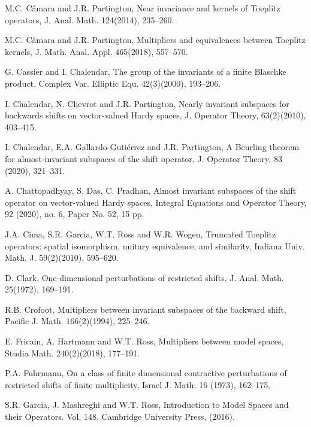 \documentclass[12pt,reqno]{amsart}
\theoremstyle{definition}
\theoremstyle{remark}
\numberwithin{equation}{section}
\begin{document}
\begin{thebibliography}{}
M.C. C\^{a}mara and J.R. Partington, Near invariance and kernels of Toeplitz operators,  J. Anal. Math. 124(2014), 235--260.

  M.C. C\^{a}mara and J.R. Partington,  Multipliers and equivalences between Toeplitz kernels, J. Math. Anal. Appl. 465(2018), 557--570.

G. Cassier and  I. Chalendar, The group of the invariants of a finite Blaschke product, Complex Var. Elliptic Equ.  42(3)(2000), 193--206.

 I. Chalendar, N. Chevrot and J.R. Partington,  Nearly invariant subspaces for backwards shifts on vector-valued Hardy spaces, J. Operator Theory, 63(2)(2010), 403--415.


I. Chalendar, E.A. Gallardo-Guti\'errez and J.R. Partington, A Beurling theorem for almost-invariant subspaces of the shift operator, J. Operator Theory, 83 (2020), 321--331.

A. Chattopadhyay, S. Das, C. Pradhan, Almost invariant subspaces of the shift operator on vector-valued Hardy spaces, Integral Equations and Operator Theory, 92 (2020), no. 6, Paper No. 52, 15 pp.


 J.A. Cima, S.R. Garcia, W.T. Ross and W.R. Wogen, Truncated Toeplitz operators: spatial isomorphism, unitary equivalence, and similarity, Indiana Univ. Math. J. 59(2)(2010), 595--620.

D. Clark, One-dimensional perturbations of restricted shifts, J. Anal. Math.  25(1972), 169--191.


R.B. Crofoot,  Multipliers between invariant subspaces of the backward shift, Pacific J. Math. 166(2)(1994), 225--246.


E. Fricain, A. Hartmann and W.T. Ross,  Multipliers between model spaces, Studia Math. 240(2)(2018), 177--191.

 P.A. Fuhrmann, On a class of finite dimensional contractive perturbations of restricted shifts of finite multiplicity, Israel J. Math.  16 (1973), 162--175.

 S.R. Garcia, J. Mashreghi and W.T. Ross, Introduction to Model Spaces and their Operators. Vol. 148. Cambridge University Press, (2016).


\end{thebibliography}
\end{document}
